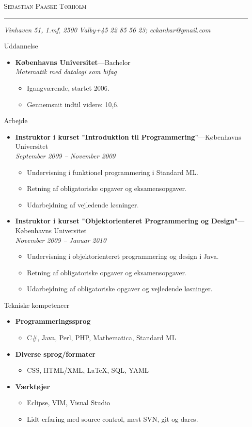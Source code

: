 \documentclass[11pt,oneside]{article}
\makeatletter
\newcommand{\name}{Sebastian Paaske Tørholm}
\newcommand{\addr}{Vinhaven 51, 1.mf, 2500 Valby}
\newcommand{\phone}{+45 22 85 56 23}
\newcommand{\email}{eckankar@gmail.com}
\newcommand{\bigname}[1]{
	\begin{center}\fontfamily{phv}\selectfont\Huge\scshape#1\end{center}
}
\newenvironment{ressection}[1]{
	\vspace{4pt}
	{\fontfamily{phv}\selectfont\Large#1}
	\begin{itemize}
	\vspace{3pt}
}{
	\end{itemize}
}
\newcommand{\resitem}[1]{
	\vspace{-4pt}
	\item \begin{flushleft} #1 \end{flushleft}
}
\newcommand{\ressubitem}[1]{
	\vspace{-1pt}
	\item \begin{flushleft} #1 \end{flushleft}
}
\newcommand{\resbigitem}[3]{
	\vspace{-5pt}
	\item
	\textbf{#1}---#2 \\
	\textit{#3}
}
\newenvironment{ressubsec}[3]{
	\resbigitem{#1}{#2}{#3}
	\vspace{-2pt}
	\begin{itemize}
}{
	\end{itemize}
}
\newenvironment{reslist}[1]{
	\resitem{\textbf{#1}}
	\vspace{-5pt}
	\begin{itemize}
}{
	\end{itemize}
}
\makeatother
\begin{document}
 \selectfont

\bigname{\name}

\vspace{-8pt} \rule{\textwidth}{1pt}

\vspace{-1pt} {\small\itshape \addr \hfill \phone; \email}

\vspace{8 pt}




\begin{ressection}{Uddannelse}

	\begin{ressubsec}{Københavns Universitet}{Bachelor}{Matematik med datalogi som bifag}
		\ressubitem{Igangværende, startet 2006.}
		\ressubitem{Gennemsnit indtil videre: 10,6.}
	\end{ressubsec}

\end{ressection}


\begin{ressection}{Arbejde}

	\begin{ressubsec}{Instruktor i kurset "Introduktion til Programmering"}{Københavns Universitet}{September 2009 -- November 2009}
		\ressubitem{Undervisning i funktionel programmering i Standard ML.}
		\ressubitem{Retning af obligatoriske opgaver og eksamensopgaver.}
		\ressubitem{Udarbejdning af vejledende løsninger.}
	\end{ressubsec}

	\begin{ressubsec}{Instruktor i kurset "Objektorienteret Programmering og Design"}{Københavns Universitet}{November 2009 -- Januar 2010}
		\ressubitem{Undervisning i objektorienteret programmering og design i Java.}
		\ressubitem{Retning af obligatoriske opgaver og eksamensopgaver.}
		\ressubitem{Udarbejdning af obligatoriske opgaver og vejledende løsninger.}
	\end{ressubsec}

\end{ressection}


\begin{ressection}{Tekniske kompetencer}
	\begin{reslist}{Programmeringssprog}
		\resitem{C\#, Java, Perl, PHP, Mathematica, Standard ML}
	\end{reslist}
	
	\begin{reslist}{Diverse sprog/formater}
		\resitem{CSS, HTML/XML, \LaTeX, SQL, YAML}
	\end{reslist}
	
	\begin{reslist}{Værktøjer}
		\resitem{Eclipse, VIM, Visual Studio}
		\resitem{Lidt erfaring med source control, mest SVN, git og darcs.}
	\end{reslist}
\end{ressection}
\end{document}
